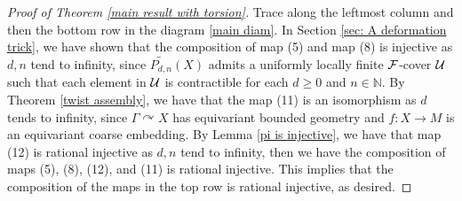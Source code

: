 \documentclass[11pt]{article}
\theoremstyle{definition}
\theoremstyle{plain}
\def\IN{\mathbb N}\def\IR{\mathbb R}\def\IE{\mathbb E}\def\IC{\mathbb C}\def\IL{\mathbb L}\def\IQ{\mathbb Q}\def\IA{\mathbb A}\def\IZ{\mathbb Z}
\def\MRdnX{\widetilde{P_{d,n}}(X)}
\def\Ga{\Gamma}
\def\car{\curvearrowright}
\begin{document}
\begin{proof}[Proof of Theorem \ref{main result with torsion}]
Trace along the leftmost column and then the bottom row in the diagram \eqref{main diam}. In Section \ref{sec: A deformation trick}, we have shown that the composition of map (5) and map (8) is injective as $d,n$ tend to infinity, since $\MRdnX$ admits a uniformly locally finite $\mathcal F$-cover $\mathcal U$ such that each element in $\mathcal U$ is contractible for each $d\geq 0$ and $n\in\IN$. By Theorem \ref{twist assembly}, we have that the map (11)
is an isomorphism as $d$ tends to infinity, since $\Ga\car X$ has equivariant bounded geometry and $f:X\to M$ is an equivariant coarse embedding. By Lemma \ref{pi is injective}, we have that map (12) is rational injective as $d,n$ tend to infinity, then we have the composition of maps (5), (8), (12), and (11) is rational injective. This implies that the composition of the maps in the top row is rational injective, as desired.
\end{proof}
\end{document}

